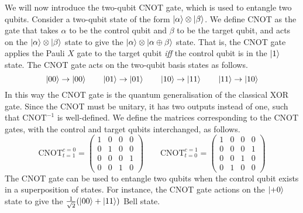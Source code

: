 We will now introduce the two-qubit CNOT gate, which is used to entangle two qubits. Consider a two-qubit state of the form $\ket \alpha \otimes \ket \beta$. We define CNOT as the gate that takes $\alpha$ to be the control qubit and $\beta$ to be the target qubit, and acts on the $\ket\alpha\otimes\ket\beta$ state to give the $\ket\alpha\otimes\ket{\alpha\oplus\beta}$ state. That is, the CNOT gate applies the Pauli $X$ gate to the target qubit \textit{iff} the control qubit is in the $\ket 1$ state. The CNOT gate acts on the two-qubit basis states as follows.
\begin{equation*}
    \ket{00} \rightarrow \ket {00} \qquad
    \ket{01} \rightarrow \ket {01} \qquad
    \ket{10} \rightarrow \ket {11} \qquad
    \ket{11} \rightarrow \ket {10}
\end{equation*}
In this way the CNOT gate is the quantum generalisation of the classical XOR gate. Since the CNOT must be unitary, it has two outputs instead of one, such that $\text{CNOT}^{-1}$ is well-defined. We define the matrices corresponding to the CNOT gates, with the control and target qubits interchanged, as follows.
\begin{equation*}
\text{CNOT}^{c=0}_{t=1} =
    \begin{pmatrix}
        1 & 0 & 0 & 0 \\
        0 & 1 & 0 & 0 \\
        0 & 0 & 0 & 1 \\
        0 & 0 & 1 & 0
    \end{pmatrix} \qquad
    \text{CNOT}^{c=1}_{t=0} =
    \begin{pmatrix}
        1 & 0 & 0 & 0 \\
        0 & 0 & 0 & 1 \\
        0 & 0 & 1 & 0 \\
        0 & 1 & 0 & 0
    \end{pmatrix}
\end{equation*}\smallskip
The CNOT gate can be used to entangle two qubits when the control qubit exists in a superposition of states. For instance, the CNOT gate actions on the $\ket{+0}$ state to give the $\frac{1}{\sqrt 2} (\ket{00} + \ket{11})$ Bell state.
